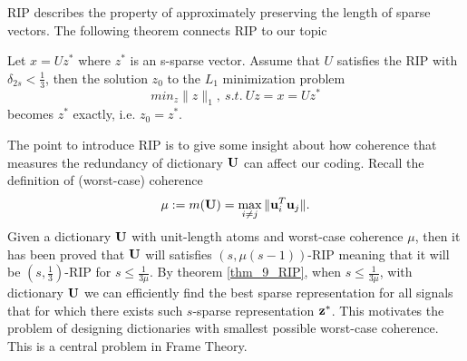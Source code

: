 \documentclass[../main.tex]{subfiles}
\begin{document}
RIP describes the property of approximately preserving the length of sparse vectors. The following theorem connects RIP to our topic
\begin{theorem}\label{thm_9_RIP}
	Let $x=Uz^*$ where $z^*$ is an s-sparse vector. Assume that $U$ satisfies the RIP with $\delta_{2s}<\frac{1}{3}$, then the solution $z_0$ to the $L_1$ minimization problem
	\begin{equation*}
	min_z \|z\|_1,\ s.t.\ Uz=x=Uz^*
	\end{equation*}
	becomes $z^*$ exactly, i.e. $z_0=z^*$.
\end{theorem}
The point to introduce RIP is to give some insight about how coherence that measures the redundancy of dictionary ${\bf U}$ can affect our coding. Recall the definition of (worst-case) coherence
\begin{equation*}
\mu:=m({\bf U})=\max_{i\neq j}\|{\bf u}_i^T{\bf u}_j\|.
\end{equation*}
Given a dictionary ${\bf U}$ with unit-length atoms and worst-case coherence $\mu$, then it has been proved that ${\bf U}$ will satisfies $(s,\mu(s-1))$-RIP meaning that it will be $(s,\frac{1}{3})$-RIP for $s\leq \frac{1}{3\mu}$. By theorem \ref{thm_9_RIP}, when $s\leq \frac{1}{3\mu}$, with dictionary ${\bf U}$ we can efficiently find the best sparse representation for all signals that for which there exists such $s$-sparse representation ${\bf z}^*$. This motivates the problem of designing dictionaries with smallest possible worst-case coherence. This is a central problem in Frame Theory.
\end{document}
